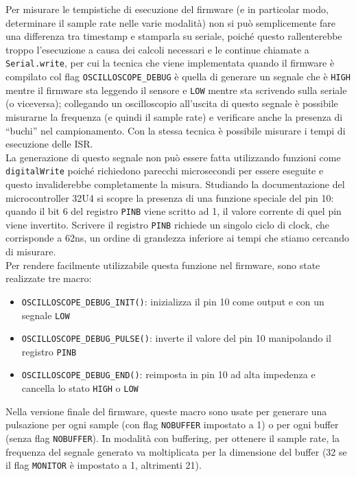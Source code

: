Per misurare le tempistiche di esecuzione del firmware (e in particolar modo, determinare il sample rate nelle varie modalità) non si può semplicemente fare una differenza tra timestamp e stamparla su seriale, poiché questo rallenterebbe troppo l'esecuzione a causa dei calcoli necessari e le continue chiamate a \texttt{Serial.write}, per cui la tecnica che viene implementata quando il firmware è compilato col flag \texttt{OSCILLOSCOPE\_DEBUG} è quella di generare un segnale che è \texttt{HIGH} mentre il firmware sta leggendo il sensore e \texttt{LOW} mentre sta scrivendo sulla seriale (o viceversa); collegando un oscilloscopio all'uscita di questo segnale è possibile misurarne la frequenza (e quindi il sample rate) e verificare anche la presenza di ``buchi'' nel campionamento. Con la stessa tecnica è possibile misurare i tempi di esecuzione delle ISR.\\
La generazione di questo segnale non può essere fatta utilizzando funzioni come \texttt{digitalWrite} poiché richiedono parecchi microsecondi per essere eseguite e questo invaliderebbe completamente la misura. Studiando la documentazione del microcontroller 32U4 si scopre la presenza di una funzione speciale del pin 10: quando il bit 6 del registro \texttt{PINB} viene scritto ad 1, il valore corrente di quel pin viene invertito\cite{atmega32u4_datasheet}. Scrivere il registro \texttt{PINB} richiede un singolo ciclo di clock, che corrisponde a 62ns, un ordine di grandezza inferiore ai tempi che stiamo cercando di misurare.\\
Per rendere facilmente utilizzabile questa funzione nel firmware, sono state realizzate tre macro:
\begin{itemize}
	\item \texttt{OSCILLOSCOPE\_DEBUG\_INIT()}: inizializza il pin 10 come output e con un segnale \texttt{LOW}
	\item \texttt{OSCILLOSCOPE\_DEBUG\_PULSE()}: inverte il valore del pin 10 manipolando il registro \texttt{PINB}
	\item \texttt{OSCILLOSCOPE\_DEBUG\_END()}: reimposta in pin 10 ad alta impedenza e cancella lo stato \texttt{HIGH} o \texttt{LOW}
\end{itemize}
Nella versione finale del firmware, queste macro sono usate per generare una pulsazione per ogni sample (con flag \texttt{NOBUFFER} impostato a 1) o per ogni buffer (senza flag \texttt{NOBUFFER}). In modalità con buffering, per ottenere il sample rate, la frequenza del segnale generato va moltiplicata per la dimensione del buffer (32 se il flag \texttt{MONITOR} è impostato a 1, altrimenti 21).

